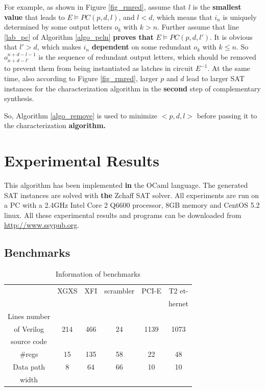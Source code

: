 \documentclass[journal]{IEEEtran}
\begin{document}
For example,
as shown in Figure \ref{fig_rmred},
assume that $l$ is the \textbf{smallest value} that leads to $E\vDash PC(p,d,l)$,
and $l<d$,
which means that $i_n$ is uniquely determined by some output letters $o_k$ with $k>n$.
Further assume that line \ref{lab_pc} of Algorithm \ref{algo_pcln} \textbf{proves that} $E\vDash PC(p,d,l')$.
It is obvious that $l'>d$,
which makes $i_n$ \textbf{dependent} on some redundant $o_k$ with $k\le n$.
So $o_{n+d-l'}^{n+d-l-1}$ is the sequence of redundant output letters,
which should be removed to prevent them from being instantiated as latches in circuit $E^{-1}$.
At the same time,
also according to Figure \ref{fig_rmred},
larger $p$ and $d$ lead to larger SAT instances for the characterization algorithm in the \textbf{second} step of complementary synthesis.

So,
Algorithm \ref{algo_remove} is used to minimize $<p,d,l>$ before passing it to the characterization \textbf{algorithm.}


\section{Experimental Results}\label{sec_exp}
This algorithm has been implemented \textbf{in} the OCaml language.
The generated SAT instances are solved with \textbf{the} Zchaff SAT solver\cite{CHAFF}.
All experiments are run on a PC with a 2.4GHz Intel Core 2 Q6600 processor, 8GB memory and CentOS 5.2 linux.
All these experimental results and programs can be downloaded from \url{http://www.ssypub.org}.
\subsection{Benchmarks}
\begin{table}[t]
\centering
\caption{Information of benchmarks}
\begin{tabular}{|c|c|c|c|c|c|}
\hline
&XGXS&XFI&scrambler&PCI-E&T2 et-\\
&&&&&hernet\\\hline
Lines number&&&&&\\
of Verilog&214&466&24&1139&1073\\
source code&&&&&\\\hline
\#regs&15&135&58&22&48\\\hline
Data path&8&64&66&10&10\\
width&&&&&\\ \hline
\end{tabular}\label{tab_info}
\end{table}
\end{document}
